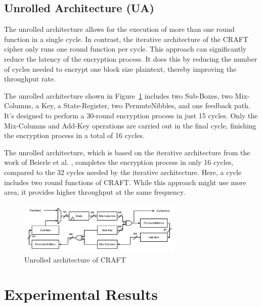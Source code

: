 \documentclass[final,5p,times,twocolumn]{elsarticle}
\begin{document}
\subsection{Unrolled Architecture (UA)}\label{subsec3}

The unrolled architecture allows for the execution of more than one round function in a single cycle. In contrast, the iterative architecture of the CRAFT cipher only runs one round function per cycle. This approach can significantly reduce the latency of the encryption process. It does this by reducing the number of cycles needed to encrypt one block size plaintext, thereby improving the throughput rate.

The unrolled architecture shown in Figure~\ref{fig4} includes two Sub-Boxes, two Mix-Columns, a Key, a State-Register, two PermuteNibbles, and one feedback path. It's designed to perform a 30-round encryption process in just 15 cycles. Only the Mix-Columns and Add-Key operations are carried out in the final cycle, finishing the encryption process in a total of 16 cycles.

The unrolled architecture, which is based on the iterative architecture from the work of Beierle et al. \cite{Beierle2019}, completes the encryption process in only 16 cycles, compared to the 32 cycles needed by the iterative architecture. Here, a cycle includes two round functions of CRAFT. While this approach might use more area, it provides higher throughput at the same frequency.


\begin{figure}[h]%
    \centering
    \includegraphics[width=0.7\textwidth]{./unrolled-archticture.pdf}
    \caption{Unrolled architecture of CRAFT}\label{fig4}
\end{figure}






\section{Experimental Results}\label{sec4}
\end{document}
